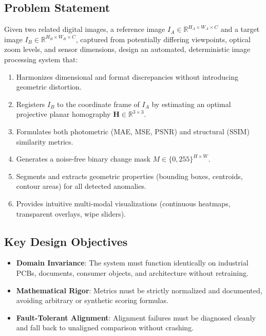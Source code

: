 \documentclass[conference]{IEEEtran}
\begin{document}
\subsection{Problem Statement}
Given two related digital images, a reference image $I_A \in \mathbb{R}^{H_A \times W_A \times C}$ and a target image $I_B \in \mathbb{R}^{H_B \times W_B \times C}$, captured from potentially differing viewpoints, optical zoom levels, and sensor dimensions, design an automated, deterministic image processing system that:
\begin{enumerate}
    \item Harmonizes dimensional and format discrepancies without introducing geometric distortion.
    \item Registers $I_B$ to the coordinate frame of $I_A$ by estimating an optimal projective planar homography $\mathbf{H} \in \mathbb{R}^{3 \times 3}$.
    \item Formulates both photometric (MAE, MSE, PSNR) and structural (SSIM) similarity metrics.
    \item Generates a noise-free binary change mask $M \in \{0, 255\}^{H \times W}$.
    \item Segments and extracts geometric properties (bounding boxes, centroids, contour areas) for all detected anomalies.
    \item Provides intuitive multi-modal visualizations (continuous heatmaps, transparent overlays, wipe sliders).
\end{enumerate}

\subsection{Key Design Objectives}
\begin{itemize}
    \item \textbf{Domain Invariance}: The system must function identically on industrial PCBs, documents, consumer objects, and architecture without retraining.
    \item \textbf{Mathematical Rigor}: Metrics must be strictly normalized and documented, avoiding arbitrary or synthetic scoring formulas.
    \item \textbf{Fault-Tolerant Alignment}: Alignment failures must be diagnosed cleanly and fall back to unaligned comparison without crashing.
\end{itemize}
\end{document}
